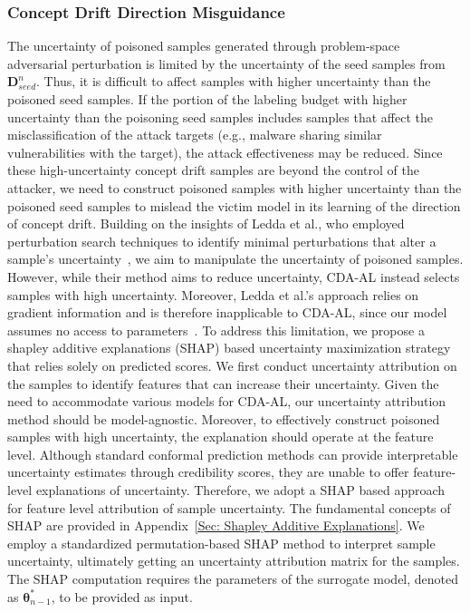 \subsubsection{Concept Drift Direction Misguidance}
\label{Sec: Strategy II: Feature-Space Perturbation}
The uncertainty of poisoned samples generated through problem-space adversarial perturbation is limited by the uncertainty of the seed samples from $\bm{D}_{seed}^{n}$.
Thus, it is difficult to affect samples with higher uncertainty than the poisoned seed samples.
If the portion of the labeling budget with higher uncertainty than the poisoning seed samples includes samples that affect the misclassification of the attack targets (e.g., malware sharing similar vulnerabilities with the target), the attack effectiveness may be reduced.
Since these high-uncertainty concept drift samples are beyond the control of the attacker, we need to construct poisoned samples with higher uncertainty than the poisoned seed samples to mislead the victim model in its learning of the direction of concept drift.
Building on the insights of Ledda et al., who employed perturbation search techniques to identify minimal perturbations that alter a sample's uncertainty~\cite{Ledda_2023_ICCV}, we aim to manipulate the uncertainty of poisoned samples.
However, while their method aims to reduce uncertainty, CDA-AL instead selects samples with high uncertainty.
Moreover, Ledda et al.’s approach relies on gradient information and is therefore inapplicable to CDA-AL, since our model assumes no access to parameters~\cite{Ledda_2023_ICCV}.
To address this limitation, we propose a shapley additive explanations (SHAP) based uncertainty maximization strategy that relies solely on predicted scores.
We first conduct uncertainty attribution on the samples to identify features that can increase their uncertainty.
Given the need to accommodate various models for CDA-AL, our uncertainty attribution method should be model-agnostic.
Moreover, to effectively construct poisoned samples with high uncertainty, the explanation should operate at the feature level.
Although standard conformal prediction methods can provide interpretable uncertainty estimates through credibility scores, they are unable to offer feature-level explanations of uncertainty.
Therefore, we adopt a SHAP based approach for feature level attribution of sample uncertainty.
The fundamental concepts of SHAP are provided in Appendix~\ref{Sec: Shapley Additive Explanations}.
We employ a standardized permutation-based SHAP method to interpret sample uncertainty, ultimately getting an uncertainty attribution matrix for the samples.
The SHAP computation requires the parameters of the surrogate model, denoted as $\bm{\theta}_{n-1}^{*}$, to be provided as input.

